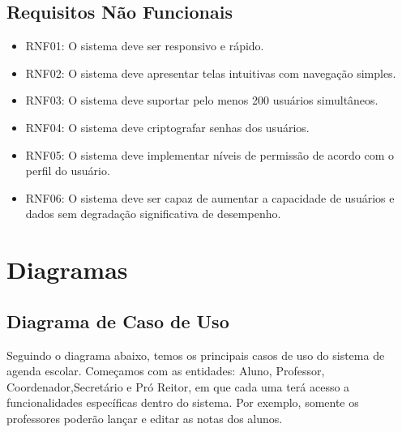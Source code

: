 \documentclass[12pt,a4paper]{report}
\begin{document}
\section{Requisitos Não Funcionais}
	\begin{itemize}
    \item RNF01: O sistema deve ser responsivo e rápido.
    \item RNF02: O sistema deve apresentar telas intuitivas com navegação simples.
    \item RNF03: O sistema deve suportar pelo menos 200 usuários simultâneos.
    \item RNF04: O sistema deve criptografar senhas dos usuários.
    \item RNF05: O sistema deve implementar níveis de permissão de acordo com o perfil do usuário.
    \item RNF06: O sistema deve ser capaz de aumentar a capacidade de usuários e dados sem degradação significativa de desempenho.
    
	\end{itemize}


\chapter{Diagramas}
\label{sec:Diagrama}
\section{Diagrama de Caso de Uso}

Seguindo o diagrama abaixo, temos os principais casos de uso do sistema de agenda escolar. Começamos com as entidades: Aluno, Professor, Coordenador,Secretário e Pró Reitor, em que cada uma terá acesso a funcionalidades específicas dentro do sistema. Por exemplo, somente os professores poderão lançar e editar as notas dos alunos.
\end{document}
